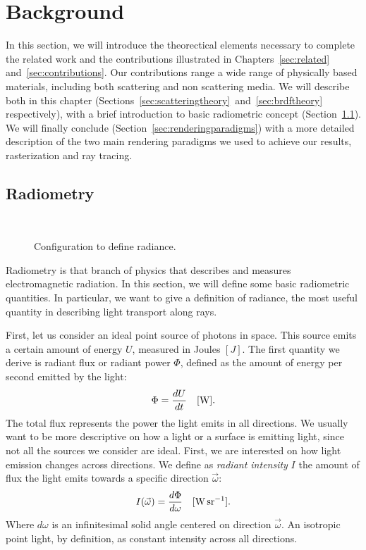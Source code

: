 \chapter{Background}
\label{sec:background}

In this section, we will introduce the theorectical elements necessary to complete the related work and the contributions illustrated in Chapters~\ref{sec:related} and~\ref{sec:contributions}. Our contributions range a wide range of physically based materials, including both scattering and non scattering media. We will describe both in this chapter (Sections~\ref{sec:scatteringtheory}~and~\ref{sec:brdftheory} respectively), with a brief introduction to basic radiometric concept (Section~\ref{sec:radiometry}). We will finally conclude (Section~\ref{sec:renderingparadigms}) with a more detailed description of the two main rendering paradigms we used to achieve our results, rasterization and ray tracing.

\section{Radiometry}
\label{sec:radiometry}
\begin{figure}
\centering
   \def\svgwidth{0.4\textwidth}
    \\
\caption{Configuration to define radiance.} %
\label{fig:radiance}
\end{figure}
Radiometry is that branch of physics that describes and measures electromagnetic radiation. In this section, we will define some basic radiometric quantities. In particular, we want to give a definition of radiance, the most useful quantity in describing light transport along rays.

First, let us consider an ideal point source of photons in space. This source emits a certain amount of energy $U$, measured in Joules $[J]$. The first quantity we derive is radiant flux or radiant power $\Phi$, defined as the amount of energy per second emitted by the light:
\begin{equation*}
\Phi = \frac{d U}{d t}  \ \ \ [\SI{}{\watt}].
\end{equation*}
The total flux represents the power the light emits in all directions. We usually want to be more descriptive on how a light or a surface is emitting light, since not all the sources we consider are ideal. First, we are interested on how light emission changes across directions.  We  define as \emph{radiant intensity} $I$ the amount of flux the light emits towards a specific direction $\vec{\omega}$:
\begin{equation*}
I(\vec{\omega}) = \frac{d \Phi}{d \omega}  \siunit{\watt \per \steradian}.
\end{equation*}   
Where $d \omega$ is an infinitesimal solid angle centered on direction $\vec{\omega}$. An isotropic point light, by definition, as constant intensity across all directions.

